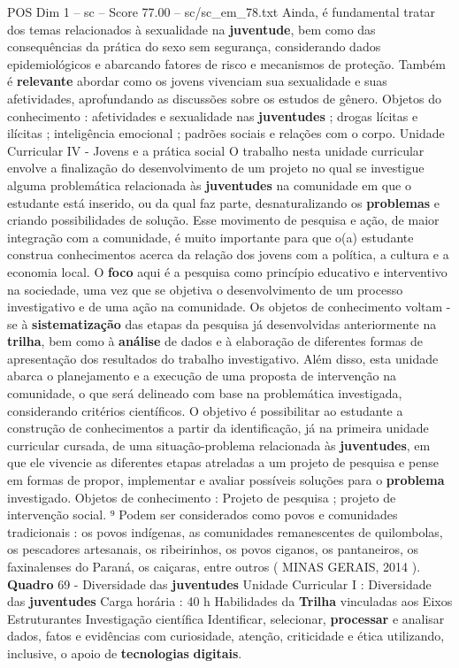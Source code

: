 \begin{textsample}{POS Dim 1 – sc – Score 77.00 – sc/sc\_em\_78.txt}
Ainda, é fundamental tratar dos temas relacionados à sexualidade na \textbf{juventude}, bem como das consequências da prática do sexo sem segurança, considerando dados epidemiológicos e abarcando fatores de risco e mecanismos de proteção.
Também é \textbf{relevante} abordar como os jovens vivenciam sua sexualidade e suas afetividades, aprofundando as discussões sobre os estudos de gênero.
Objetos do conhecimento : afetividades e sexualidade nas \textbf{juventudes} ; drogas lícitas e ilícitas ; inteligência emocional ; padrões sociais e relações com o corpo.
Unidade Curricular IV - Jovens e a prática social O trabalho nesta unidade curricular envolve a finalização do desenvolvimento de um projeto no qual se investigue alguma problemática relacionada às \textbf{juventudes} na comunidade em que o estudante está inserido, ou da qual faz parte, desnaturalizando os \textbf{problemas} e criando possibilidades de solução.
Esse movimento de pesquisa e ação, de maior integração com a comunidade, é muito importante para que o(a) estudante construa conhecimentos acerca da relação dos jovens com a política, a cultura e a economia local.
O \textbf{foco} aqui é a pesquisa como princípio educativo e interventivo na sociedade, uma vez que se objetiva o desenvolvimento de um processo investigativo e de uma ação na comunidade.
Os objetos de conhecimento voltam -se à \textbf{sistematização} das etapas da pesquisa já desenvolvidas anteriormente na \textbf{trilha}, bem como à \textbf{análise} de dados e à elaboração de diferentes formas de apresentação dos resultados do trabalho investigativo.
Além disso, esta unidade abarca o planejamento e a execução de uma proposta de intervenção na comunidade, o que será delineado com base na problemática investigada, considerando critérios científicos.
O objetivo é possibilitar ao estudante a construção de conhecimentos a partir da identificação, já na primeira unidade curricular cursada, de uma situação-problema relacionada às \textbf{juventudes}, em que ele vivencie as diferentes etapas atreladas a um projeto de pesquisa e pense em formas de propor, implementar e avaliar possíveis soluções para o \textbf{problema} investigado.
Objetos de conhecimento : Projeto de pesquisa ; projeto de intervenção social. ⁹ Podem ser considerados como povos e comunidades tradicionais : os povos indígenas, as comunidades remanescentes de quilombolas, os pescadores artesanais, os ribeirinhos, os povos ciganos, os pantaneiros, os faxinalenses do Paraná, os caiçaras, entre outros ( MINAS GERAIS, 2014 ). \textbf{Quadro} 69 - Diversidade das \textbf{juventudes} Unidade Curricular I : Diversidade das \textbf{juventudes} Carga horária : 40 h Habilidades da \textbf{Trilha} vinculadas aos Eixos Estruturantes Investigação científica Identificar, selecionar, \textbf{processar} e analisar dados, fatos e evidências com curiosidade, atenção, criticidade e ética utilizando, inclusive, o apoio de \textbf{tecnologias} \textbf{digitais}.

\end{textsample}
